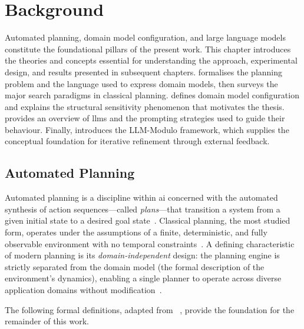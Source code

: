 
\chapter{Background}\label{ch:background}

Automated planning, domain model configuration, and large language models constitute the foundational pillars of the present work.
This chapter introduces the theories and concepts essential for understanding the approach, experimental design, and results presented in subsequent chapters.
 formalises the planning problem and the language used to express domain models, then surveys the major search paradigms in classical planning.
 defines domain model configuration and explains the structural sensitivity phenomenon that motivates the thesis.
 provides an overview of \glspl{llm} and the prompting strategies used to guide their behaviour.
Finally,  introduces the LLM-Modulo framework, which supplies the conceptual foundation for iterative refinement through external feedback.

\section{Automated Planning}
\label{sec:bg:planning}

Automated planning is a discipline within \gls{ai} concerned with the automated synthesis of action sequences---called \emph{plans}---that transition a system from a given initial state to a desired goal state~\cite{GhallabNauTraverso2004, RussellNorvig2021}.
Classical planning, the most studied form, operates under the assumptions of a finite, deterministic, and fully observable environment with no temporal constraints~\cite{GhallabNauTraverso2004}.
A defining characteristic of modern planning is its \emph{domain-independent} design: the planning engine is strictly separated from the domain model (the formal description of the environment's dynamics), enabling a single planner to operate across diverse application domains without modification~\cite{McDermott1998}.

The following formal definitions, adapted from \citeauthor{Georgievski2025}~\cite{Georgievski2025}, provide the foundation for the remainder of this work.

